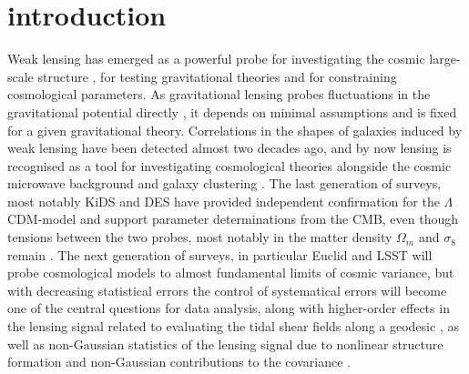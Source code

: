 \documentclass[a4paper,fleqn,usenatbib]{mnras}
\begin{document}
\section{introduction}\label{sect_intro}
Weak lensing has emerged as a powerful probe for investigating the cosmic large-scale structure \citep{mellier_probing_1999, bartelmann_weak_2001, amara_optimal_2007, bartelmann_gravitational_2010, kilbinger_cosmology_2015}, for testing gravitational theories and for constraining cosmological parameters. As gravitational lensing probes fluctuations in the gravitational potential directly \citep{kaiser_weak_1992, hu_weak_1999, hu_dark_2001, hu_dark_2002, bernstein_dark_2004, heavens_3d_2003,  heavens_measuring_2006, munshi_cosmology_2008, grassi_detecting_2014}, it depends on minimal assumptions and is fixed for a given gravitational theory. Correlations in the shapes of galaxies induced by weak lensing \citep{bernstein_shapes_2002, bernstein_comprehensive_2009} have been detected almost two decades ago, and by now lensing is recognised as a tool for investigating cosmological theories alongside the cosmic microwave background and galaxy clustering \citep{van_waerbeke_efficiency_1999, huterer_weak_2002, huterer_weak_2010, mortonson_dark_2013}. The last generation of surveys, most notably KiDS and DES \citep{Abbott:2017wau} have provided independent confirmation for the $\Lambda$CDM-model and support parameter determinations from the CMB, even though tensions between the two probes, most notably in the matter density $\Omega_m$ and $\sigma_8$ remain \citep{maccrann_cosmic_2014, douspis_tension_2019}. The next generation of surveys, in particular Euclid \citep{Amendola:2016saw} and LSST will probe cosmological models to almost fundamental limits of cosmic variance, but with decreasing statistical errors the control of systematical errors will become one of the central questions for data analysis, along with higher-order effects in the lensing signal related to evaluating the tidal shear fields along a geodesic \citep{Ghosh:2018nsm, thomas_relativistic_2014}, as well as non-Gaussian statistics of the lensing signal due to nonlinear structure formation and non-Gaussian contributions to the covariance \citep{jain_cosmological_1997, kayo_cosmological_2013, kayo_information_2013, munshi_tomography_2014}.
\end{document}
